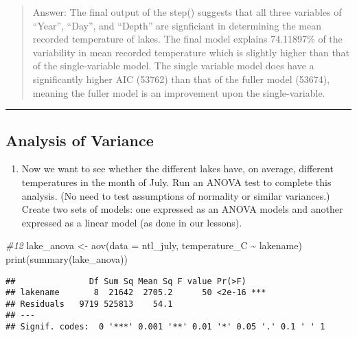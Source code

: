 \documentclass[
]{article}
\newenvironment{Shaded}{\begin{snugshade}}{\end{snugshade}}
\newcommand{\AttributeTok}[1]{\textcolor[rgb]{0.77,0.63,0.00}{#1}}
\newcommand{\CommentTok}[1]{\textcolor[rgb]{0.56,0.35,0.01}{\textit{#1}}}
\newcommand{\FunctionTok}[1]{\textcolor[rgb]{0.00,0.00,0.00}{#1}}
\newcommand{\NormalTok}[1]{#1}
\newcommand{\OtherTok}[1]{\textcolor[rgb]{0.56,0.35,0.01}{#1}}
\newcommand{\SpecialCharTok}[1]{\textcolor[rgb]{0.00,0.00,0.00}{#1}}
\providecommand{\tightlist}{%
  \setlength{\itemsep}{0pt}\setlength{\parskip}{0pt}}
\begin{document}
\begin{quote}
Answer: The final output of the step() suggests that all three variables
of ``Year'', ``Day'', and ``Depth'' are signficiant in determining the
mean recorded temperature of lakes. The final model explains 74.11897\%
of the variability in mean recorded temperature which is slightly higher
than that of the single-variable model. The single variable model does
have a significantly higher AIC (53762) than that of the fuller model
(53674), meaning the fuller model is an improvement upon the
single-variable.
\end{quote}

\begin{center}\rule{0.5\linewidth}{0.5pt}\end{center}

\hypertarget{analysis-of-variance}{%
\subsection{Analysis of Variance}\label{analysis-of-variance}}

\begin{enumerate}
\def\labelenumi{\arabic{enumi}.}
\setcounter{enumi}{11}
\tightlist
\item
  Now we want to see whether the different lakes have, on average,
  different temperatures in the month of July. Run an ANOVA test to
  complete this analysis. (No need to test assumptions of normality or
  similar variances.) Create two sets of models: one expressed as an
  ANOVA models and another expressed as a linear model (as done in our
  lessons).
\end{enumerate}

\begin{Shaded}
\begin{Highlighting}[]
\CommentTok{\#12}
\NormalTok{lake\_anova }\OtherTok{\textless{}{-}} \FunctionTok{aov}\NormalTok{(}\AttributeTok{data =}\NormalTok{ ntl\_july, temperature\_C }\SpecialCharTok{\textasciitilde{}}\NormalTok{ lakename)}
\FunctionTok{print}\NormalTok{(}\FunctionTok{summary}\NormalTok{(lake\_anova))}
\end{Highlighting}
\end{Shaded}

\begin{verbatim}
##               Df Sum Sq Mean Sq F value Pr(>F)    
## lakename       8  21642  2705.2      50 <2e-16 ***
## Residuals   9719 525813    54.1                   
## ---
## Signif. codes:  0 '***' 0.001 '**' 0.01 '*' 0.05 '.' 0.1 ' ' 1
\end{verbatim}
\end{document}

